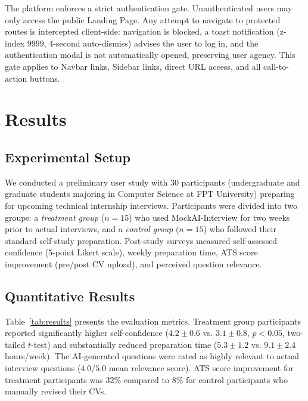 \documentclass[pdflatex,sn-mathphys-num]{sn-jnl}%
\theoremstyle{thmstyleone}%
\theoremstyle{thmstyletwo}%
\theoremstyle{thmstylethree}%
\begin{document}
The platform enforces a strict authentication gate. Unauthenticated users may only access the public Landing Page. Any attempt to navigate to protected routes is intercepted client-side: navigation is blocked, a toast notification (z-index 9999, 4-second auto-dismiss) advises the user to log in, and the authentication modal is not automatically opened, preserving user agency. This gate applies to Navbar links, Sidebar links, direct URL access, and all call-to-action buttons.

\section{Results}\label{sec5}

\subsection{Experimental Setup}\label{subsec4-1}

We conducted a preliminary user study with 30 participants (undergraduate and graduate students majoring in Computer Science at FPT University) preparing for upcoming technical internship interviews. Participants were divided into two groups: a \textit{treatment group} ($n=15$) who used MockAI-Interview for two weeks prior to actual interviews, and a \textit{control group} ($n=15$) who followed their standard self-study preparation. Post-study surveys measured self-assessed confidence (5-point Likert scale), weekly preparation time, ATS score improvement (pre/post CV upload), and perceived question relevance.

\subsection{Quantitative Results}\label{subsec4-2}

Table~\ref{tab:results} presents the evaluation metrics. Treatment group participants reported significantly higher self-confidence ($4.2 \pm 0.6$ vs. $3.1 \pm 0.8$, $p < 0.05$, two-tailed $t$-test) and substantially reduced preparation time ($5.3 \pm 1.2$ vs. $9.1 \pm 2.4$ hours/week). The AI-generated questions were rated as highly relevant to actual interview questions ($4.0/5.0$ mean relevance score). ATS score improvement for treatment participants was 32\% compared to 8\% for control participants who manually revised their CVs.
\end{document}
